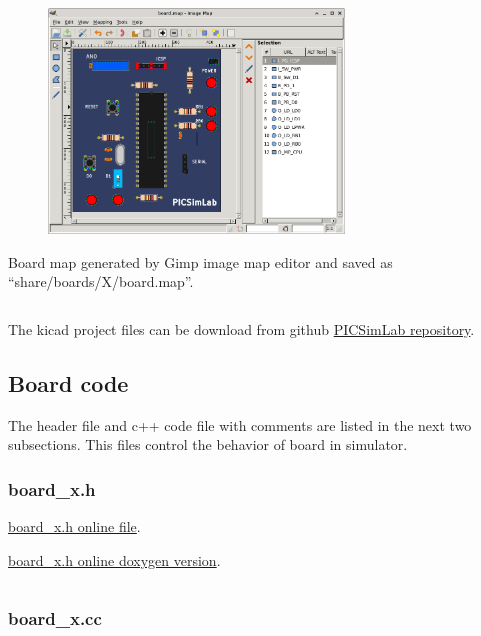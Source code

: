 \begin{figure}[H]
\center
\includegraphics[width=0.7\textwidth]{img/hb/gimp06.png} 
\end{figure} 


Board map generated by Gimp image map editor and saved as ``share/boards/X/board.map''.
\inputminted[baselinestretch=1.2,fontsize=\footnotesize,linenos]{html}{files/share/board.map}

The kicad project files can be download from github \href{https://github.com/lcgamboa/picsimlab_docs/tree/main/kicad/board_x}{PICSimLab repository}. 

\subsection{Board code}

The header file and c++ code file with comments are listed in the next two subsections. This files control the behavior of board in simulator.

\subsubsection{board\_x.h}

\href{https://github.com/lcgamboa/picsimlab/blob/master/src/boards/board_x.h}{ board\_x.h online file}.

\href{https://lcgamboa.github.io/picsimlab_docs/devel/html/index.html#binc}{ board\_x.h online doxygen version}.


\inputminted[baselinestretch=1.2,fontsize=\footnotesize,linenos]{c++}{files/board_x.h}

\pagebreak
\subsubsection{board\_x.cc}

